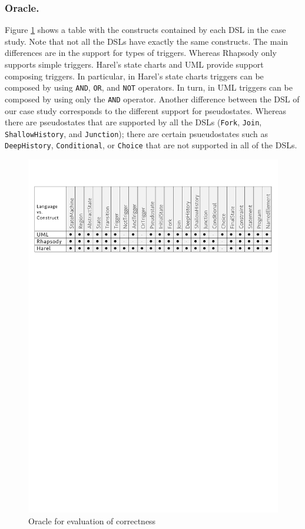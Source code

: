 \subsubsection{Oracle.} Figure \ref{fig:oracle} shows a table with the constructs contained by each DSL in the case study. Note that not all the DSLs have exactly the same constructs. The main differences are in the support for types of triggers. Whereas Rhapsody only supports simple triggers. Harel's state charts and UML provide support composing triggers. In particular, in Harel's state charts triggers can be composed by using \texttt{AND}, \texttt{OR}, and \texttt{NOT} operators. In turn, in UML triggers can be composed by using only the \texttt{AND} operator. Another difference between the DSL of our case study corresponds to the different support for pseudostates. Whereas there are pseudostates that are supported by all the DSLs (\texttt{Fork}, \texttt{Join}, \texttt{ShallowHistory}, and \texttt{Junction}); there are certain psueudostates such as \texttt{DeepHistory}, \texttt{Conditional}, or \texttt{Choice} that are not supported in all of the DSLs.

\begin{figure}
\centering
\includegraphics[width=1\linewidth]{images/oracle.pdf}
\caption{Oracle for evaluation of correctness}
\label{fig:oracle}
\end{figure}

